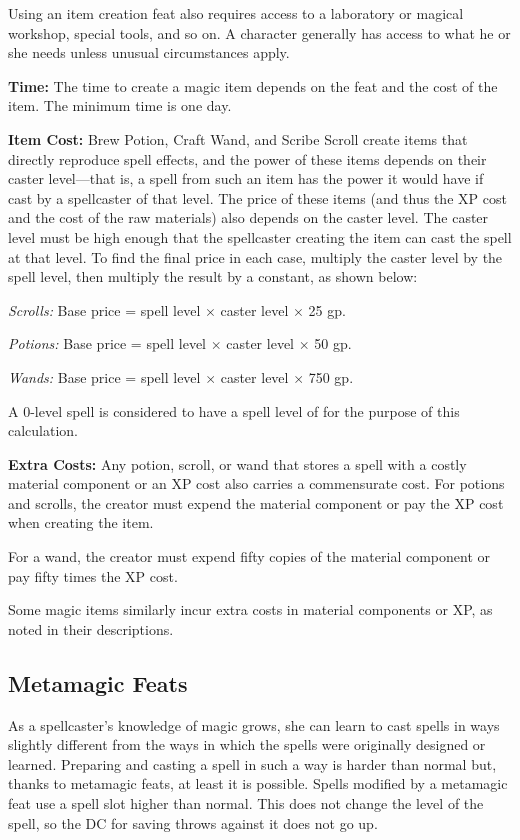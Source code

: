 Using an item creation feat also requires access to a laboratory or magical workshop, special tools, and so on. A character generally has access to what he or she needs unless unusual circumstances apply.

\textbf{Time:} The time to create a magic item depends on the feat and the cost of the item. The minimum time is one day.

\textbf{Item Cost:} Brew Potion, Craft Wand, and Scribe Scroll create items that directly reproduce spell effects, and the power of these items depends on their caster level---that is, a spell from such an item has the power it would have if cast by a spellcaster of that level. The price of these items (and thus the XP cost and the cost of the raw materials) also depends on the caster level. The caster level must be high enough that the spellcaster creating the item can cast the spell at that level. To find the final price in each case, multiply the caster level by the spell level, then multiply the result by a constant, as shown below:

\textit{Scrolls:} Base price = spell level $\times$ caster level $\times$ 25 gp.

\textit{Potions:} Base price = spell level $\times$ caster level $\times$ 50 gp.

\textit{Wands:} Base price = spell level $\times$ caster level $\times$ 750 gp.

A 0-level spell is considered to have a spell level of \onehalf for the purpose of this calculation.

\textbf{Extra Costs:} Any potion, scroll, or wand that stores a spell with a costly material component or an XP cost also carries a commensurate cost. For potions and scrolls, the creator must expend the material component or pay the XP cost when creating the item.

For a wand, the creator must expend fifty copies of the material component or pay fifty times the XP cost.

Some magic items similarly incur extra costs in material components or XP, as noted in their descriptions.

\subsection{Metamagic Feats}
As a spellcaster’s knowledge of magic grows, she can learn to cast spells in ways slightly different from the ways in which the spells were originally designed or learned. Preparing and casting a spell in such a way is harder than normal but, thanks to metamagic feats, at least it is possible. Spells modified by a metamagic feat use a spell slot higher than normal. This does not change the level of the spell, so the DC for saving throws against it does not go up.

